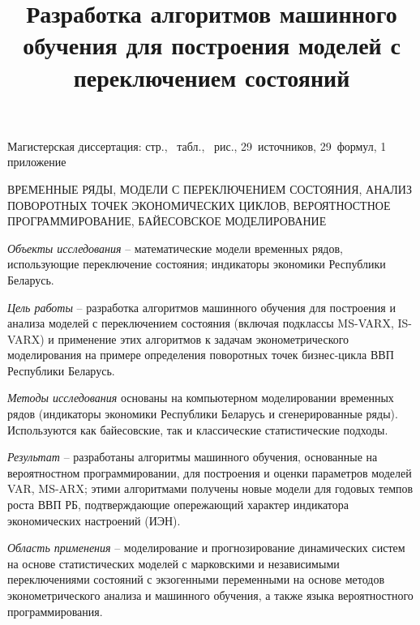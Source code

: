 \documentclass[a4paper,14pt]{extreport}
\title{Разработка алгоритмов машинного обучения для построения моделей с переключением состояний}
\author{\@authorlast \@authorfirst}
\newcommand{\totalreferences}{29}
\newcommand{\totalformulas}{29}
\begin{document}
\maketitle




Магистерская диссертация: \pageref{LastPage} стр., \totaltables\ табл., \totalfigures\ рис., \totalreferences\ источников, \totalformulas\ формул, 1 приложение

\MakeUppercase{временные ряды, модели с переключением состояния, анализ поворотных точек экономических циклов, вероятностное программирование, байесовское моделирование}

\textit{Объекты исследования} -- математические модели временных рядов, использующие переключение состояния; индикаторы экономики Республики Беларусь.

\textit{Цель работы} -- разработка алгоритмов машинного обучения для построения и анализа моделей с переключением состояния (включая подклассы MS-VARX, IS-VARX) и применение этих алгоритмов к задачам эконометрического моделирования на примере определения поворотных точек бизнес-цикла ВВП Республики Беларусь.

\textit{Методы исследования} основаны на компьютерном моделировании временных рядов (индикаторы экономики Республики Беларусь и сгенерированные ряды). Используются как байесовские, так и классические статистические подходы.

\textit{Результат} -- разработаны алгоритмы машинного обучения, основанные на вероятностном программировании, для построения и оценки параметров моделей VAR, MS-ARX; этими алгоритмами получены новые модели для годовых темпов роста ВВП РБ, подтверждающие опережающий характер индикатора экономических настроений (ИЭН). 

\textit{Область применения} -- моделирование и прогнозирование динамических систем на основе статистических моделей с марковскими и независимыми переключениями состояний с экзогенными переменными на основе методов эконометрического анализа и машинного обучения, а также языка вероятностного программирования.
\end{document}
